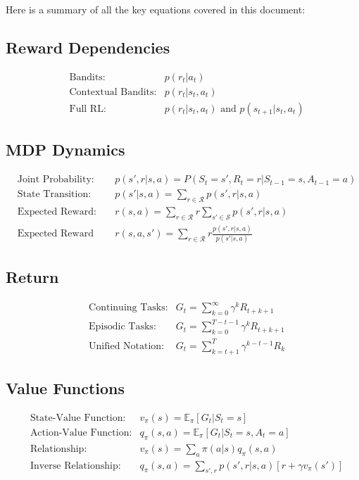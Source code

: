 \documentclass[12pt,a4paper]{article}
\begin{document}
Here is a summary of all the key equations covered in this document:

\subsection{Reward Dependencies}
\begin{align}
&\text{Bandits:} & p(r_t|a_t) \\
&\text{Contextual Bandits:} & p(r_t|s_t, a_t) \\
&\text{Full RL:} & p(r_t|s_t, a_t) \text{ and } p(s_{t+1}|s_t, a_t)
\end{align}

\subsection{MDP Dynamics}
\begin{align}
&\text{Joint Probability:} & p(s',r|s,a) = P(S_t = s', R_t = r|S_{t-1} = s, A_{t-1} = a) \\
&\text{State Transition:} & p(s'|s,a) = \sum_{r \in \mathcal{R}} p(s',r|s,a) \\
&\text{Expected Reward:} & r(s,a) = \sum_{r \in \mathcal{R}} r \sum_{s' \in \mathcal{S}} p(s',r|s,a) \\
&\text{Expected Reward with Next State:} & r(s,a,s') = \sum_{r \in \mathcal{R}} r \frac{p(s',r|s,a)}{p(s'|s,a)}
\end{align}

\subsection{Return}
\begin{align}
&\text{Continuing Tasks:} & G_t = \sum_{k=0}^{\infty} \gamma^k R_{t+k+1} \\
&\text{Episodic Tasks:} & G_t = \sum_{k=0}^{T-t-1} \gamma^k R_{t+k+1} \\
&\text{Unified Notation:} & G_t = \sum_{k=t+1}^{T} \gamma^{k-t-1} R_k
\end{align}

\subsection{Value Functions}
\begin{align}
&\text{State-Value Function:} & v_{\pi}(s) = \mathbb{E}_{\pi}[G_t|S_t = s] \\
&\text{Action-Value Function:} & q_{\pi}(s,a) = \mathbb{E}_{\pi}[G_t|S_t = s, A_t = a] \\
&\text{Relationship:} & v_{\pi}(s) = \sum_{a} \pi(a|s) q_{\pi}(s, a) \\
&\text{Inverse Relationship:} & q_{\pi}(s, a) = \sum_{s', r} p(s', r|s, a) [r + \gamma v_{\pi}(s')]
\end{align}
\end{document}
